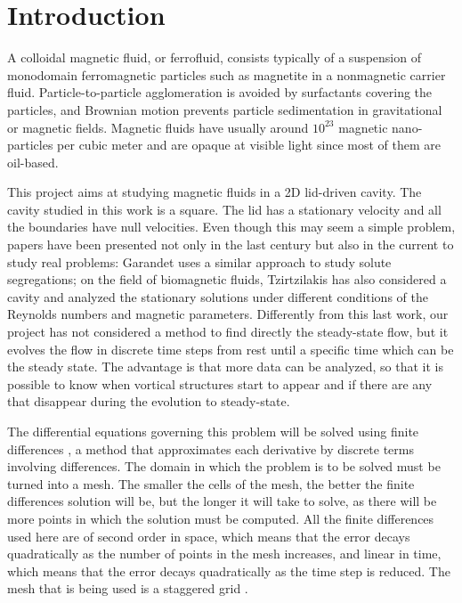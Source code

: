 \documentclass[journal]{IEEEtran}
\begin{document}
%
\IEEEpeerreviewmaketitle

\section{Introduction}
A colloidal magnetic fluid, or ferrofluid, consists typically of a suspension of monodomain ferromagnetic particles such as magnetite in a nonmagnetic carrier fluid. Particle-to-particle agglomeration is avoided by surfactants covering the particles, and Brownian motion prevents particle sedimentation in gravitational or magnetic fields\cite{RosensweigMagneticFluids}. Magnetic fluids have usually around $10^{23}$ magnetic nano-particles per cubic meter and are opaque at visible light since most of them are oil-based.

This project aims at studying magnetic fluids in a 2D lid-driven cavity. The cavity studied in this work is a square. The lid has a stationary velocity and all the boundaries have null velocities. Even though this may seem a simple problem, papers have been presented not only in the last century but also in the current to study real problems: Garandet \cite{Garandet2012149} uses a similar approach to study solute segregations; on the field of biomagnetic fluids, Tzirtzilakis \cite{Tzirtzilakis2013} has also considered a cavity and analyzed the stationary solutions under different conditions of the Reynolds numbers and magnetic parameters. Differently from this last work, our project has not considered a method to find directly the steady-state flow, but it evolves the flow in discrete time steps from rest until a specific time which can be the steady state. The advantage is that more data can be analyzed, so that it is possible to know when vortical structures start to appear and if there are any that disappear during the evolution to steady-state. 

The differential equations governing this problem will be solved using finite differences \cite{zbMATH03010997}, a method that approximates each derivative by discrete terms involving differences. The domain in which the problem is to be solved must be turned into a mesh. The smaller the cells of the mesh, the better the finite differences solution will be, but the longer it will take to solve, as there will be more points in which the solution must be computed. All the finite differences used here are of second order in space, which means that the error decays quadratically as the number of points in the mesh increases, and linear in time, which means that the error decays quadratically as the time step is reduced. The mesh that is being used is a staggered grid \cite{hinchLectureNotes}. 
\end{document}
